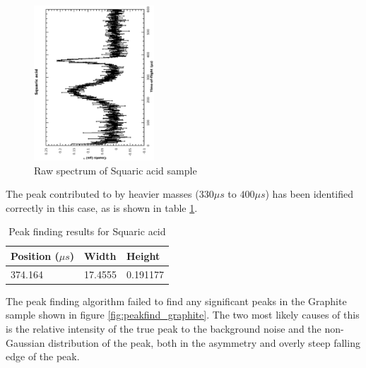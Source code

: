 \documentclass[a4paper]{article}
\begin{document}
\begin{figure}[h!]
  \centering
  \begin{turn}{-90}
    \includegraphics[width=0.4\textwidth]{graphics/peakfind_squaric_acid.eps}
  \end{turn}
  \caption{Raw spectrum of Squaric acid sample}
  \label{fig:peakfind_sq_acid}
\end{figure}
\FloatBarrier

The peak contributed to by heavier masses ($330 \mu s$ to $400 \mu s$) has been
identified correctly in this case, as is shown in table
\ref{tab:peakfind_sq_acid}.

\begin{table}[h!]
  \centering
  \begin{tabular}{@{}lll@{}}
    \toprule
    Position ($\mu s$) & Width   & Height   \\
    \midrule
    374.164            & 17.4555 & 0.191177 \\
    \bottomrule
  \end{tabular}
  \caption{Peak finding results for Squaric acid}
  \label{tab:peakfind_sq_acid}
\end{table}
\FloatBarrier

The peak finding algorithm failed to find any significant peaks in the Graphite
sample shown in figure \ref{fig:peakfind_graphite}. The two most likely causes
of this is the relative intensity of the true peak to the background noise and
the non-Gaussian distribution of the peak, both in the asymmetry and overly
steep falling edge of the peak.
\end{document}
